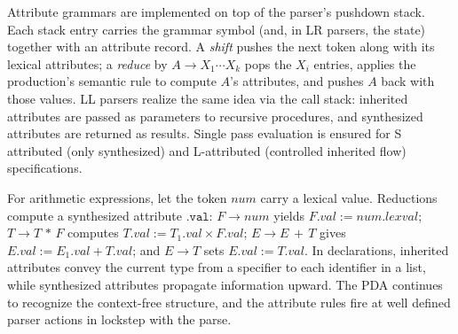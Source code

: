 Attribute grammars are implemented on top of the parser's pushdown stack. Each stack entry carries the grammar symbol (and, in LR parsers, the state) 
together with an attribute record. A \emph{shift} pushes the next token along with its lexical attributes; a \emph{reduce} by \(A \rightarrow X_1\cdots X_k\)
 pops the \(X_i\) entries, applies the production's semantic rule to compute \(A\)'s attributes, and pushes \(A\) back with those values. LL parsers 
 realize the same idea via the call stack: inherited attributes are passed as parameters to recursive procedures, and synthesized attributes are returned 
 as results. Single pass evaluation is ensured for S attributed (only synthesized) and L-attributed (controlled inherited flow) specifications.

For arithmetic expressions, let the token \(\textit{num}\) carry a lexical value. Reductions compute a synthesized attribute
 \(\texttt{.val}\): \(F \rightarrow \textit{num}\) yields \(F.val := \textit{num.lexval}\); \(T \rightarrow T\,*\,F\) computes 
 \(T.val := T_1.val \times F.val\); \(E \rightarrow E\,+\,T\) gives \(E.val := E_1.val + T.val\); and \(E \rightarrow T\) sets
  \(E.val := T.val\). In declarations, inherited attributes convey the current type from a specifier to each identifier in a list, while synthesized 
  attributes propagate information upward. The PDA continues to recognize the context-free structure, and the attribute rules fire at well defined 
  parser actions in lockstep with the parse.


